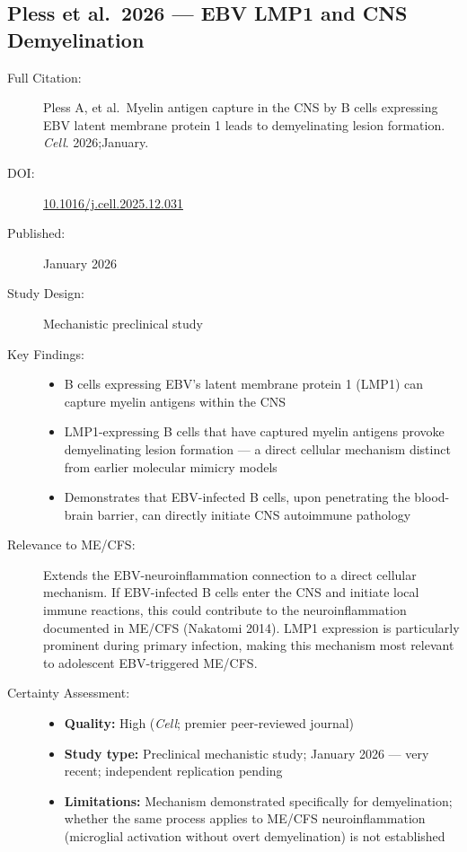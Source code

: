 \subsection{Pless et al.\ 2026 --- EBV LMP1 and CNS Demyelination}

\begin{description}
    \item[Full Citation:] Pless A, et al.\ Myelin antigen capture in the CNS by B cells expressing EBV latent membrane protein 1 leads to demyelinating lesion formation. \textit{Cell}. 2026;January.
    \item[DOI:] \href{https://doi.org/10.1016/j.cell.2025.12.031}{10.1016/j.cell.2025.12.031}
    \item[Published:] January 2026
    \item[Study Design:] Mechanistic preclinical study
    \item[Key Findings:]
    \begin{itemize}
        \item B cells expressing EBV's latent membrane protein 1 (LMP1) can capture myelin antigens within the CNS
        \item LMP1-expressing B cells that have captured myelin antigens provoke demyelinating lesion formation --- a direct cellular mechanism distinct from earlier molecular mimicry models
        \item Demonstrates that EBV-infected B cells, upon penetrating the blood-brain barrier, can directly initiate CNS autoimmune pathology
    \end{itemize}
    \item[Relevance to ME/CFS:] Extends the EBV-neuroinflammation connection to a direct cellular mechanism. If EBV-infected B cells enter the CNS and initiate local immune reactions, this could contribute to the neuroinflammation documented in ME/CFS (Nakatomi 2014). LMP1 expression is particularly prominent during primary infection, making this mechanism most relevant to adolescent EBV-triggered ME/CFS.
    \item[Certainty Assessment:]
    \begin{itemize}
        \item \textbf{Quality:} High (\textit{Cell}; premier peer-reviewed journal)
        \item \textbf{Study type:} Preclinical mechanistic study; January 2026 --- very recent; independent replication pending
        \item \textbf{Limitations:} Mechanism demonstrated specifically for demyelination; whether the same process applies to ME/CFS neuroinflammation (microglial activation without overt demyelination) is not established
    \end{itemize}
\end{description}

